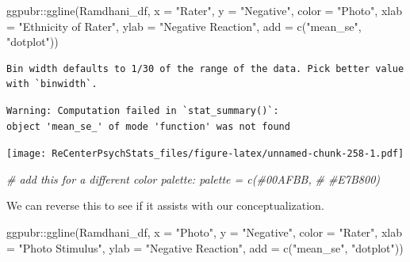 \documentclass[
  11pt,
]{book}
\newenvironment{Shaded}{\begin{snugshade}}{\end{snugshade}}
\newcommand{\AttributeTok}[1]{\textcolor[rgb]{0.77,0.63,0.00}{#1}}
\newcommand{\CommentTok}[1]{\textcolor[rgb]{0.56,0.35,0.01}{\textit{#1}}}
\newcommand{\FunctionTok}[1]{\textcolor[rgb]{0.00,0.00,0.00}{#1}}
\newcommand{\NormalTok}[1]{#1}
\newcommand{\SpecialCharTok}[1]{\textcolor[rgb]{0.00,0.00,0.00}{#1}}
\newcommand{\StringTok}[1]{\textcolor[rgb]{0.31,0.60,0.02}{#1}}
\begin{document}
\begin{Shaded}
\begin{Highlighting}[]
\NormalTok{ggpubr}\SpecialCharTok{::}\FunctionTok{ggline}\NormalTok{(Ramdhani\_df, }\AttributeTok{x =} \StringTok{"Rater"}\NormalTok{, }\AttributeTok{y =} \StringTok{"Negative"}\NormalTok{, }\AttributeTok{color =} \StringTok{"Photo"}\NormalTok{,}
    \AttributeTok{xlab =} \StringTok{"Ethnicity of Rater"}\NormalTok{, }\AttributeTok{ylab =} \StringTok{"Negative Reaction"}\NormalTok{, }\AttributeTok{add =} \FunctionTok{c}\NormalTok{(}\StringTok{"mean\_se"}\NormalTok{,}
        \StringTok{"dotplot"}\NormalTok{))}
\end{Highlighting}
\end{Shaded}

\begin{verbatim}
Bin width defaults to 1/30 of the range of the data. Pick better value with `binwidth`.
\end{verbatim}

\begin{verbatim}
Warning: Computation failed in `stat_summary()`:
object 'mean_se_' of mode 'function' was not found
\end{verbatim}

\texttt{[image: ReCenterPsychStats\_files/figure-latex/unnamed-chunk-258-1.pdf]}

\begin{Shaded}
\begin{Highlighting}[]
\CommentTok{\# add this for a different color palette: palette = c(\textquotesingle{}\#00AFBB\textquotesingle{},}
\CommentTok{\# \textquotesingle{}\#E7B800\textquotesingle{})}
\end{Highlighting}
\end{Shaded}

We can reverse this to see if it assists with our conceptualization.

\begin{Shaded}
\begin{Highlighting}[]
\NormalTok{ggpubr}\SpecialCharTok{::}\FunctionTok{ggline}\NormalTok{(Ramdhani\_df, }\AttributeTok{x =} \StringTok{"Photo"}\NormalTok{, }\AttributeTok{y =} \StringTok{"Negative"}\NormalTok{, }\AttributeTok{color =} \StringTok{"Rater"}\NormalTok{,}
    \AttributeTok{xlab =} \StringTok{"Photo Stimulus"}\NormalTok{, }\AttributeTok{ylab =} \StringTok{"Negative Reaction"}\NormalTok{, }\AttributeTok{add =} \FunctionTok{c}\NormalTok{(}\StringTok{"mean\_se"}\NormalTok{,}
        \StringTok{"dotplot"}\NormalTok{))}
\end{Highlighting}
\end{Shaded}
\end{document}

